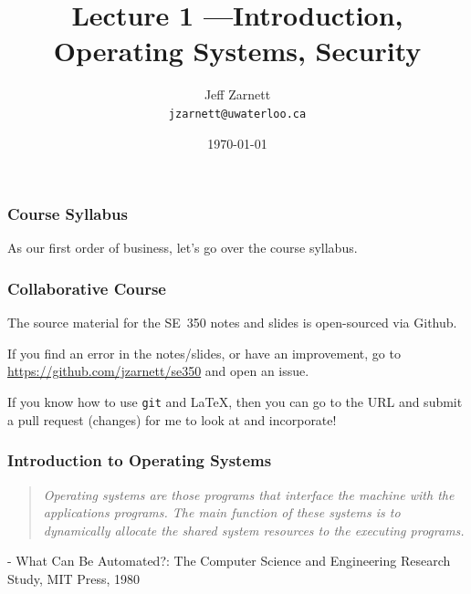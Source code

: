 

\title{Lecture 1 ---Introduction, Operating Systems, Security}

\author{Jeff Zarnett \\ \small \texttt{jzarnett@uwaterloo.ca}}
\date{\today}




\begin{frame}
  \titlepage

 \end{frame}

\begin{frame}
\frametitle{Course Syllabus}

As our first order of business, let's go over the course syllabus.

\end{frame}

\begin{frame}
\frametitle{Collaborative Course}

The source material for the SE~350 notes and slides is open-sourced via Github. 

If you find an error in the notes/slides, or have an improvement, go to \url{https://github.com/jzarnett/se350} and open an issue. 

If you know how to use \texttt{git} and \LaTeX, then you can go to the URL and submit a pull request (changes) for me to look at and incorporate!


\end{frame}

\begin{frame}
\frametitle{Introduction to Operating Systems}

\begin{quote}
\textit{Operating systems are those programs that interface the machine with the applications programs. The main function of these systems is to dynamically allocate the shared system resources to the executing programs.}
\end{quote}

\hfill - What Can Be Automated?: The Computer Science and Engineering Research Study, MIT Press, 1980

\end{frame}



